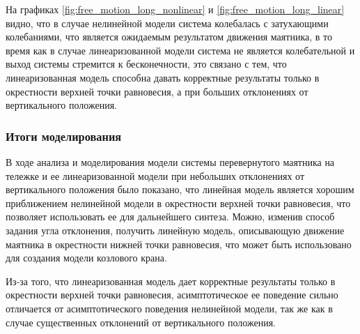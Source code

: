 На графиках \ref{fig:free_motion_long_nonlinear} и \ref{fig:free_motion_long_linear} видно, что
в случае нелинейной модели система колебалась с затухающими колебаниями, что является
ожидаемым результатом движения маятника, в то время как в случае линеаризованной модели система 
не является колебательной и выход системы стремится к бесконечности, это связано с тем, что
линеаризованная модель способна давать корректные результаты только в окрестности 
верхней точки равновесия, а при больших отклонениях от вертикального положения. 

\FloatBarrier
\subsubsection{Итоги моделирования}
В ходе анализа и моделирования модели системы перевернутого маятника на тележке 
и ее линеаризованной модели при небольших отклонениях от вертикального положения 
было показано, что линейная модель является хорошим приближением нелинейной модели 
в окрестности верхней точки равновесия, что позволяет использовать ее для дальнейшего
синтеза. Можно, изменив способ задания угла отклонения, получить линейную модель, 
описывающую движение маятника в окрестности нижней точки равновесия, что 
может быть использовано для создания модели козлового крана.

Из-за того, что линеаризованная модель дает корректные результаты только в окрестности 
верхней точки равновесия, асимптотическое ее поведение сильно отличается от
асимптотического поведения нелинейной модели, так же как в случае 
существенных отклонений от вертикального положения. 